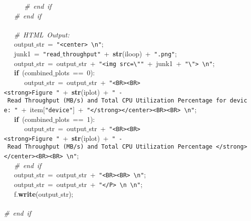 \mbox{}\ \ \ \ \ \ \textit{\#\ end\ if} \\
\mbox{}\ \ \ \textit{\#\ end\ if} \\
\mbox{}\ \ \  \\
\mbox{}\ \ \ \textit{\#\ HTML\ Output:} \\
\mbox{}\ \ \ output$\_$str\ =\ \texttt{"{}\textless{}center\textgreater{}\ \textbackslash{}n"{}}; \\
\mbox{}\ \ \ junk1\ =\ \texttt{"{}read$\_$throughput"{}}\ +\ \textbf{str}(iloop)\ +\ \texttt{"{}.png"{}}; \\
\mbox{}\ \ \ output$\_$str\ =\ output$\_$str\ +\ \texttt{"{}\textless{}img\ src=\textbackslash{}"{}"{}}\ +\ junk1\ +\ \texttt{"{}\textbackslash{}"{}\textgreater{}\ \textbackslash{}n"{}}; \\
\mbox{}\ \ \ \textbf{if}\ (combined$\_$plots\ ==\ 0): \\
\mbox{}\ \ \ \ \ \ output$\_$str\ =\ output$\_$str\ +\ \texttt{"{}\textless{}BR\textgreater{}\textless{}BR\textgreater{}\textless{}strong\textgreater{}Figure\ "{}}\ +\ \textbf{str}(iplot)\ +\ \texttt{"{}\ -\ Read\ Throughput\ (MB/s)\ and\ Total\ CPU\ Utilization\ Percentage\ for\ device:\ "{}}\ +\ item[\texttt{"{}device"{}}]\ +\ \texttt{"{}\textless{}/strong\textgreater{}\textless{}/center\textgreater{}\textless{}BR\textgreater{}\textless{}BR\textgreater{}\ \textbackslash{}n"{}}; \\
\mbox{}\ \ \ \textbf{if}\ (combined$\_$plots\ ==\ 1): \\
\mbox{}\ \ \ \ \ \ output$\_$str\ =\ output$\_$str\ +\ \texttt{"{}\textless{}BR\textgreater{}\textless{}BR\textgreater{}\textless{}strong\textgreater{}Figure\ "{}}\ +\ \textbf{str}(iplot)\ +\ \texttt{"{}\ -\ Read\ Throughput\ (MB/s)\ and\ Total\ CPU\ Utilization\ Percentage\ \textless{}/strong\textgreater{}\textless{}/center\textgreater{}\textless{}BR\textgreater{}\textless{}BR\textgreater{}\ \textbackslash{}n"{}}; \\
\mbox{}\ \ \ \textit{\#\ end\ if} \\
\mbox{}\ \ \ output$\_$str\ =\ output$\_$str\ +\ \texttt{"{}\textless{}BR\textgreater{}\textless{}BR\textgreater{}\ \textbackslash{}n"{}}; \\
\mbox{}\ \ \ output$\_$str\ =\ output$\_$str\ +\ \texttt{"{}\textless{}/P\textgreater{}\ \textbackslash{}n\ \textbackslash{}n"{}}; \\
\mbox{}\ \ \ f.\textbf{write}(output$\_$str); \\
\mbox{}\ \ \  \\
\mbox{}\textit{\#\ end\ if} \\
